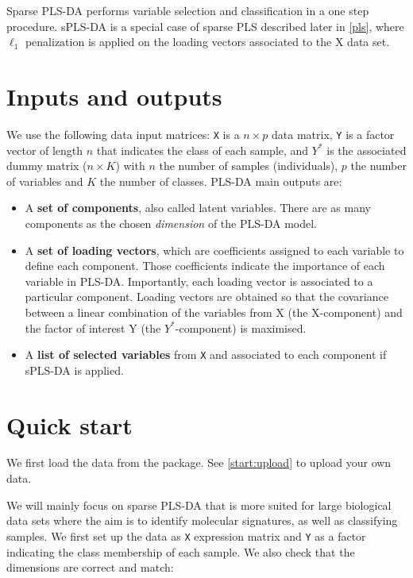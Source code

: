 \documentclass[]{book}
\theoremstyle{definition}
\theoremstyle{definition}
\theoremstyle{definition}
\theoremstyle{remark}
\begin{document}
Sparse PLS-DA \citep{Lec11} performs variable selection and
classification in a one step procedure. sPLS-DA is a special case of
sparse PLS described later in \ref{pls}, where \(\ell_1\) penalization
is applied on the loading vectors associated to the X data set.

\section{Inputs and outputs}\label{inputs-and-outputs}

We use the following data input matrices: \texttt{X} is a \(n \times p\)
data matrix, \texttt{Y} is a factor vector of length \(n\) that
indicates the class of each sample, and \(Y^*\) is the associated dummy
matrix (\(n \times K\)) with \(n\) the number of samples (individuals),
\(p\) the number of variables and \(K\) the number of classes. PLS-DA
main outputs are:

\begin{itemize}
\item
  A \textbf{set of components}, also called latent variables. There are
  as many components as the chosen \emph{dimension} of the PLS-DA model.
\item
  A \textbf{set of loading vectors}, which are coefficients assigned to
  each variable to define each component. Those coefficients indicate
  the importance of each variable in PLS-DA. Importantly, each loading
  vector is associated to a particular component. Loading vectors are
  obtained so that the covariance between a linear combination of the
  variables from X (the X-component) and the factor of interest Y (the
  \(Y^*\)-component) is maximised.
\item
  A \textbf{list of selected variables} from \texttt{X} and associated
  to each component if sPLS-DA is applied.
\end{itemize}

\section{Quick start}\label{quick-start-1}

We first load the data from the package. See \ref{start:upload} to
upload your own data.

We will mainly focus on sparse PLS-DA that is more suited for large
biological data sets where the aim is to identify molecular signatures,
as well as classifying samples. We first set up the data as \texttt{X}
expression matrix and \texttt{Y} as a factor indicating the class
membership of each sample. We also check that the dimensions are correct
and match:
\end{document}
